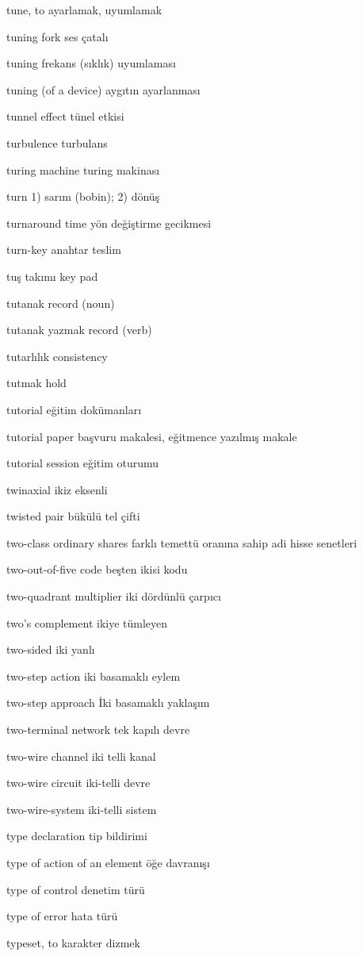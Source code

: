 \documentclass[12pt,fleqn]{article}\usepackage{../../common}
\begin{document}
tune, to ayarlamak, uyumlamak

tuning fork ses çatalı

tuning frekans (sıklık) uyumlaması

tuning (of a device) aygıtın ayarlanması

tunnel effect tünel etkisi

turbulence turbulans

turing machine turing makinası

turn 1) sarım (bobin); 2) dönüş

turnaround time yön değiştirme gecikmesi

turn-key anahtar teslim

tuş takımı key pad

tutanak record (noun)

tutanak yazmak record (verb)

tutarlılık consistency

tutmak hold

tutorial eğitim dokümanları

tutorial paper başvuru makalesi, eğitmence yazılmış makale

tutorial session eğitim oturumu

twinaxial ikiz eksenli

twisted pair bükülü tel çifti

two-class ordinary shares farklı temettü oranına sahip adi hisse senetleri

two-out-of-five code beşten ikisi kodu

two-quadrant multiplier iki dördünlü çarpıcı

two's complement ikiye tümleyen

two-sided iki yanlı

two-step action iki basamaklı eylem

two-step approach İki basamaklı yaklaşım

two-terminal network tek kapılı devre

two-wire channel iki telli kanal

two-wire circuit iki-telli devre

two-wire-system iki-telli sistem

type declaration tip bildirimi

type of action of an element öğe davranışı

type of control denetim türü

type of error hata türü

typeset, to karakter dizmek
\end{document}

